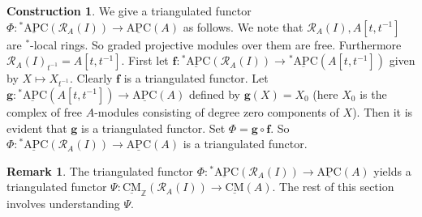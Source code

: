 \documentclass{amsart}
\newcommand{\Z}{\mathbb{Z} }
\newcommand{\eR}{\mathcal{R} }
\newcommand{\rt}{\rightarrow}
\newcommand{\CMS}{\operatorname{\underline{CM}}}
\newcommand{\apc}{\operatorname{\underline{APC}}}
\newcommand{\gapc}{\operatorname{\underline{^*APC}}}
\theoremstyle{plain}
\theoremstyle{definition}
\newtheorem{remark}[theorem]{Remark}
\newtheorem{construction}[theorem]{Construction}
\theoremstyle{remark}
\begin{document}
{\begin{construction}
\label{mom} We give a triangulated functor $\Phi \colon \gapc(\eR_A(I)) \rt \apc(A)$ as follows.
We note that $\eR_A(I), A[t,t^{-1}]$ are $^*$-local rings. So graded projective modules over them are free. Furthermore $\eR_A(I)_{t^{-1}} = A[t,t^{-1}]$.
First let $\mathbf{f} \colon \gapc(\eR_A(I)) \rt \gapc(A[t,t^{-1}])$ given by $X \mapsto X_{t^{-1}}$. Clearly $\mathbf{f}$ is a triangulated functor. Let $\mathbf{g} \colon \gapc(A[t,t^{-1}]) \rt \apc(A)$ defined by
$\mathbf{g}(X) = X_0$ (here $X_0$ is the complex of free $A$-modules consisting of degree zero components of $X$). Then it is evident that $\mathbf{g}$ is a triangulated functor. Set $\Phi = \mathbf{g}\circ \mathbf{f}$. So $\Phi \colon \gapc(\eR_A(I)) \rt \apc(A)$ is a triangulated functor.
\end{construction}

\begin{remark}\label{induce}
  The triangulated functor $\Phi \colon \gapc(\eR_A(I)) \rt \apc(A)$ yields a triangulated functor $\Psi \colon \CMS_\Z(\eR_A(I)) \rt \CMS(A)$.  The rest of this section  involves understanding $\Psi$.
\end{remark}

}
\end{document}
